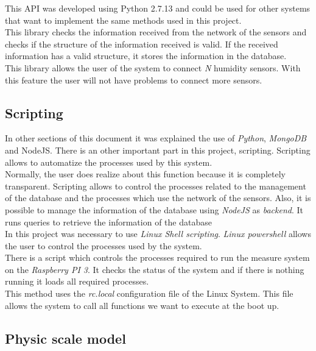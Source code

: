 This API was developed using Python 2.7.13 and could be used for other systems that want to implement the same methods used in this project.\\

This library checks the information received from the network of the sensors and checks if the structure of the information received is valid. If the received information has a valid structure, it stores the information in the database.\\

This library allows the user of the system to connect \textit{N} humidity sensors. With this feature the user will not have problems to connect more sensors.

\subsection{Scripting}

In other sections of this document it was explained the use of \textit{Python}, \textit{MongoDB} and NodeJS. There is an other important part in this project, scripting. Scripting allows to automatize the processes used by this system.\\

Normally, the user does realize about this function because it is completely transparent. Scripting allows to control the processes related to the management of the database and the processes which use the network of the sensors. Also, it is possible to manage the information of the database using \textit{NodeJS} as \textit{backend}. It runs queries to retrieve the information of the database\\

In this project was necessary to use \textit{Linux Shell scripting}. \textit{Linux powershell} allows the user to control the processes used by the system.\\

There is a script which controls the processes required to run the measure system on the \textit{Raspberry PI 3}. It checks the status of the system and if there is nothing running it loads all required processes.\\

This method uses the \textit{rc.local} configuration file of the Linux System. This file allows the system to call all functions we want to execute at the boot up.

\subsection{Physic scale model}

